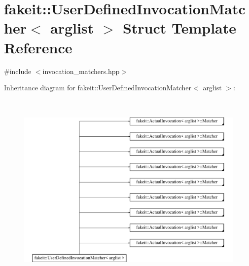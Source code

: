 \hypertarget{structfakeit_1_1UserDefinedInvocationMatcher}{}\section{fakeit\+::User\+Defined\+Invocation\+Matcher$<$ arglist $>$ Struct Template Reference}
\label{structfakeit_1_1UserDefinedInvocationMatcher}


{\ttfamily \#include $<$invocation\+\_\+matchers.\+hpp$>$}

Inheritance diagram for fakeit\+::User\+Defined\+Invocation\+Matcher$<$ arglist $>$\+:\begin{figure}[H]
\begin{center}
\leavevmode
\includegraphics[height=9.688581cm]{structfakeit_1_1UserDefinedInvocationMatcher}
\end{center}
\end{figure}

